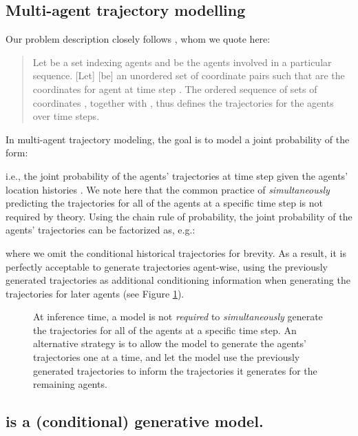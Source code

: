 \subsection{Multi-agent trajectory modelling}

Our problem description closely follows \citet{alcorn2021baller2vec}, whom we quote here:

\begin{quote}
Let  be a set indexing  agents and  be the  agents involved in a particular sequence.
[Let]  [be] an unordered set of  coordinate pairs such that  are the coordinates for agent  at time step .
The ordered sequence of sets of coordinates , together with , thus defines the trajectories for the  agents over  time steps.
\end{quote}

In multi-agent trajectory modeling, the goal is to model a joint probability of the form:



\noindent
i.e., the joint probability of the  agents' trajectories  at time step  given the agents' location histories .
We note here that the common practice of \textit{simultaneously} predicting the trajectories for all of the agents at a specific time step is not required by theory.
Using the chain rule of probability, the joint probability of the agents' trajectories can be factorized as, e.g.:



where we omit the conditional historical trajectories for brevity.
As a result, it is perfectly acceptable to generate trajectories agent-wise, using the previously generated trajectories as additional conditioning information when generating the trajectories for later agents (see Figure \ref{fig:legal_dep}).

\begin{figure}[ht]
\centering
{}
\caption{
At inference time, a model is not \textit{required} to \textit{simultaneously} generate the trajectories for all of the agents at a specific time step.
An alternative strategy is to allow the model to generate the agents' trajectories one at a time, and let the model use the previously generated trajectories to inform the trajectories it generates for the remaining agents.
}
\label{fig:legal_dep}
\end{figure}

\subsection{\btv{} is a (conditional) generative model.}\label{sec:baller2vec_generative}

